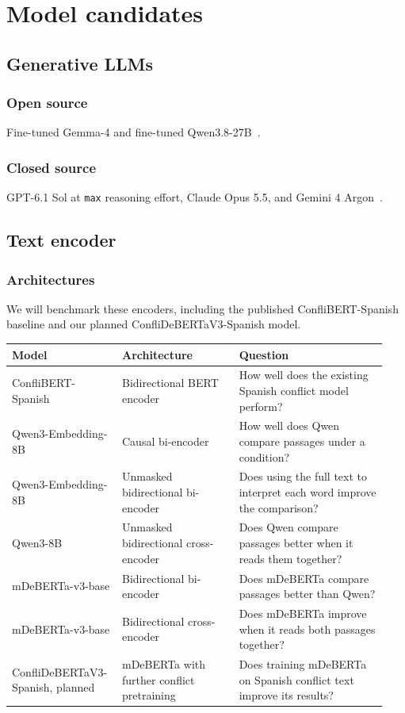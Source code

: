 \documentclass{article}
\begin{document}
\section{Model candidates}
\subsection{Generative LLMs}
\subsubsection{Open source}
Fine-tuned Gemma-4 and fine-tuned Qwen3.8-27B~\cite{ModelDocs}.

\subsubsection{Closed source}
GPT-6.1 Sol at \texttt{max} reasoning effort, Claude Opus 5.5, and Gemini 4 Argon~\cite{ModelDocs}.

\subsection{Text encoder}
\subsubsection{Architectures}
We will benchmark these encoders, including the published ConfliBERT-Spanish baseline and our planned ConfliDeBERTaV3-Spanish model.
\begin{center}
\small
\begin{tabular}{@{}>{\raggedright\arraybackslash}p{0.26\linewidth}>{\raggedright\arraybackslash}p{0.30\linewidth}>{\raggedright\arraybackslash}p{0.38\linewidth}@{}}
\toprule
\textbf{Model} & \textbf{Architecture} & \textbf{Question} \\
\midrule
ConfliBERT-Spanish~\cite{ConfliBERT-Spanish} & Bidirectional BERT encoder & How well does the existing Spanish conflict model perform? \\
Qwen3-Embedding-8B & Causal bi-encoder & How well does Qwen compare passages under a condition? \\
Qwen3-Embedding-8B & Unmasked bidirectional bi-encoder & Does using the full text to interpret each word improve the comparison? \\
Qwen3-8B & Unmasked bidirectional cross-encoder & Does Qwen compare passages better when it reads them together? \\
mDeBERTa-v3-base & Bidirectional bi-encoder & Does mDeBERTa compare passages better than Qwen? \\
mDeBERTa-v3-base & Bidirectional cross-encoder & Does mDeBERTa improve when it reads both passages together? \\
ConfliDeBERTaV3-Spanish, planned & mDeBERTa with further conflict pretraining & Does training mDeBERTa on Spanish conflict text improve its results? \\
\bottomrule
\end{tabular}
\end{center}
\end{document}
